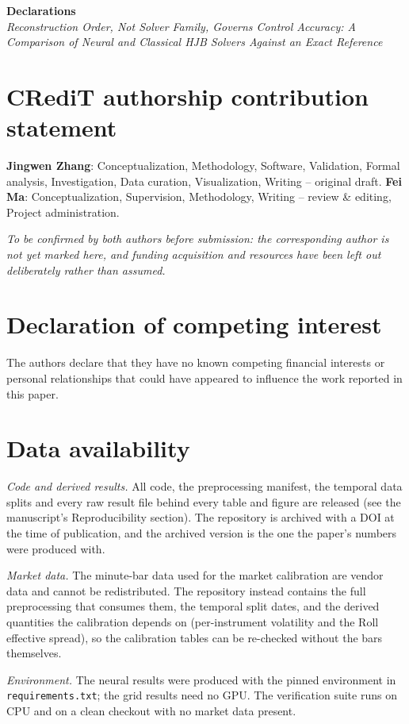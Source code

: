 \documentclass[11pt]{article}
\newcommand{\paper}{Reconstruction Order, Not Solver Family, Governs Control Accuracy: A Comparison
of Neural and Classical HJB Solvers Against an Exact Reference}
\begin{document}
\begin{center}
{\large\bfseries Declarations}\\[0.3em]
{\itshape \paper}
\end{center}

\section*{CRediT authorship contribution statement}

\textbf{Jingwen Zhang}: Conceptualization, Methodology, Software, Validation, Formal analysis,
Investigation, Data curation, Visualization, Writing -- original draft.
\textbf{Fei Ma}: Conceptualization, Supervision, Methodology, Writing -- review \& editing,
Project administration.

\emph{To be confirmed by both authors before submission: the corresponding author is not yet marked
here, and funding acquisition and resources have been left out deliberately rather than assumed.}

\section*{Declaration of competing interest}

The authors declare that they have no known competing financial interests or personal relationships
that could have appeared to influence the work reported in this paper.

\section*{Data availability}

\emph{Code and derived results.} All code, the preprocessing manifest, the temporal data splits and
every raw result file behind every table and figure are released
(see the manuscript's Reproducibility section). The repository is archived with a DOI at the time of
publication, and the archived version is the one the paper's numbers were produced with.

\emph{Market data.} The minute-bar data used for the market calibration are vendor data and cannot be
redistributed. The repository instead contains the full preprocessing that consumes them, the
temporal split dates, and the derived quantities the calibration depends on (per-instrument
volatility and the Roll effective spread), so the calibration tables can be re-checked without the
bars themselves.

\emph{Environment.} The neural results were produced with the pinned environment in
\texttt{requirements.txt}; the grid results need no GPU. The verification suite runs on CPU and on a
clean checkout with no market data present.
\end{document}
